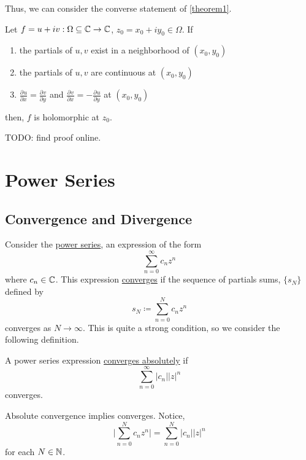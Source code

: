 \documentclass[11pt]{article}
\newcommand*{\pd}[3][]{\ensuremath{\frac{\partial^{#1} #2}{\partial #3^{#1}}}}
\begin{document}
Thus, we can consider the converse statement of \cref{theorem1}.
\begin{theorem}
Let $f=u+iv : \Omega \subseteq \mathbb{C} \to \mathbb{C}$, $z_0 = x_0 + iy_0 \in \Omega$. If
\begin{enumerate}
\item the partials of $u,v$ exist in a neighborhood of $(x_0,y_0)$
\item the partials of $u,v$ are continuous at $(x_0,y_0)$
\item $\pd{u}{x} = \pd{v}{y}$ and $\pd{v}{x} = - \pd{u}{y}$ at $(x_0,y_0)$
\end{enumerate}
then, $f$ is holomorphic at $z_0$.
\label{theorem2}
\end{theorem}
TODO: find proof online.

\pagebreak
\section{Power Series}
\subsection{Convergence and Divergence}
\begin{example}
Consider the \underline{power series}, an expression of the form
\begin{equation*}
\sum^\infty_{n=0} c_nz^n
\end{equation*}
where $c_n \in \mathbb{C}$. This expression \underline{converges} if the sequence of
partials sums, $\{s_N\}$ defined by
\begin{equation*}
s_N \coloneqq \sum^N_{n=0} c_nz^n 
\end{equation*}
converges as $N \to \infty$. This is quite a strong condition, so we consider
the following definition.
\end{example}
\begin{definition}
A power series expression \underline{converges absolutely} if
\begin{equation*}
\sum^{\infty}_{n=0} |c_n||z|^n
\end{equation*}
converges.
\end{definition}
\begin{remark}
Absolute convergence implies converges. Notice,
\begin{equation*}
\bigg| \sum_{n=0}^N c_n z^n \bigg| = \sum^N_{n=0} |c_n||z|^n
\end{equation*}
for each $N \in \mathbb{N}$.
\end{remark}
\end{document}

